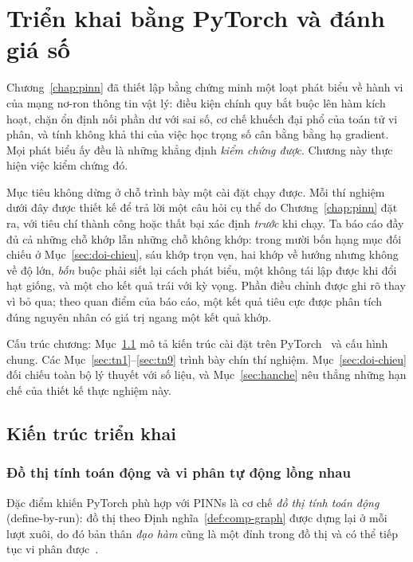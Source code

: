 \chapter{Triển khai bằng PyTorch và đánh giá số}
\label{chap:thucnghiem}
 
Chương~\ref{chap:pinn} đã thiết lập bằng chứng minh một loạt phát biểu về hành vi
của mạng nơ-ron thông tin vật lý: điều kiện chính quy bắt buộc lên hàm kích hoạt,
chặn ổn định nối phần dư với sai số, cơ chế khuếch đại phổ của toán tử vi phân, và
tính không khả thi của việc học trọng số cân bằng bằng hạ gradient. Mọi phát biểu
ấy đều là những khẳng định \emph{kiểm chứng được}. Chương này thực hiện việc kiểm
chứng đó.
 
Mục tiêu không dừng ở chỗ trình bày một cài đặt chạy được. Mỗi thí nghiệm dưới
đây được thiết kế để trả lời một câu hỏi cụ thể do Chương~\ref{chap:pinn} đặt ra,
với tiêu chí thành công hoặc thất bại xác định \emph{trước} khi chạy. Ta báo cáo
đầy đủ cả những chỗ khớp lẫn những chỗ không khớp: trong mười bốn hạng mục đối
chiếu ở Mục~\ref{sec:doi-chieu}, sáu khớp trọn vẹn, hai khớp về hướng nhưng
không về độ lớn, \emph{bốn} buộc phải siết lại cách phát biểu, một không tái lập
được khi đổi hạt giống, và một cho kết quả trái với kỳ vọng.
Phần điều chỉnh được ghi rõ thay vì bỏ qua; theo quan điểm của báo cáo, một kết
quả tiêu cực được phân tích đúng nguyên nhân có giá trị ngang một kết quả khớp.
 
Cấu trúc chương: Mục~\ref{sec:trienkhai} mô tả kiến trúc cài đặt trên
PyTorch~\cite{paszke2019} và cấu hình chung. Các
Mục~\ref{sec:tn1}--\ref{sec:tn9} trình bày chín thí nghiệm.
Mục~\ref{sec:doi-chieu} đối chiếu toàn bộ lý thuyết với số liệu, và
Mục~\ref{sec:hanche} nêu thẳng những hạn chế của thiết kế thực nghiệm này.
 
\section{Kiến trúc triển khai}
\label{sec:trienkhai}
 
\subsection{Đồ thị tính toán động và vi phân tự động lồng nhau}
\label{ssec:ad-pytorch}
 
Đặc điểm khiến PyTorch phù hợp với PINNs là cơ chế \emph{đồ thị tính toán động}
(define-by-run): đồ thị theo Định nghĩa~\ref{def:comp-graph} được dựng lại ở mỗi
lượt xuôi, do đó bản thân \emph{đạo hàm} cũng là một đỉnh trong đồ thị và có thể
tiếp tục vi phân được~\cite{paszke2019}.
 

